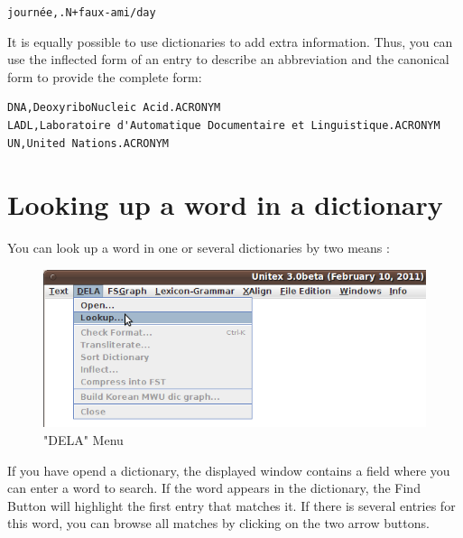 \noindent
\texttt{journ\'ee,.N+faux-ami/day}


\bigskip
\noindent It is equally possible to use dictionaries to add extra information.
Thus, you can use the inflected form of an entry to describe an abbreviation and the
canonical form to provide the complete form:

\bigskip
\begin{verbatim}
DNA,DeoxyriboNucleic Acid.ACRONYM
LADL,Laboratoire d'Automatique Documentaire et Linguistique.ACRONYM
UN,United Nations.ACRONYM
\end{verbatim}


\section{Looking up a word in a dictionary}
 
\label{section-dictionary-lookup}
You can look up a word in one or several dictionaries by two means : 

\begin{figure}[h!]
\begin{center}
\includegraphics[width=13cm]{resources/img/fig3-1.png}
\caption{"DELA" Menu}
\end{center}
\end{figure}

\bigskip
\noindent
If you have opend a dictionary, the displayed window contains a field where you can enter a word to search. If the word appears in the dictionary, the Find Button will highlight the first entry that matches it. If there is several entries for this word, you can browse all matches by clicking on the two arrow buttons.


